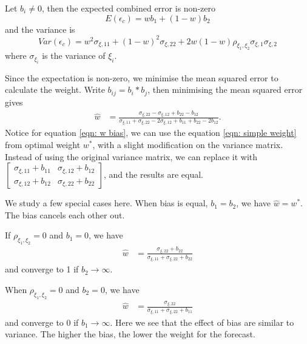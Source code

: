 \documentclass[11pt]{article}
\begin{document}
Let $b_i \neq 0$, then the expected combined error is non-zero
\begin{equation}
E(\epsilon_c) = wb_1+(1-w)b_2
\end{equation}
and the variance is
\begin{equation}
Var(\epsilon_c) = w^2\sigma_{\xi,11} + (1-w)^2\sigma_{\xi,22} + 2w(1-w)\rho_{\xi_1,\xi_2}\sigma_{\xi,1}\sigma_{\xi,2}
\end{equation}
where $\sigma_{\xi_i}$ is the variance of $\xi_i$.

Since the expectation is non-zero, we minimise the mean squared error to calculate the weight.
Write \(b_{ij}=b_i*b_j\), then minimising the mean squared error gives
\begin{equation}
\label{eqn: w bias}
\begin{aligned}
\hat{w} &= \frac{\sigma_{\xi,22}-\sigma_{\xi,12}+b_{22}-b_{12}}{\sigma_{\xi,11}+\sigma_{\xi,22}-2\sigma_{\xi,12}+b_{11}+b_{22}-2b_{12}}.
\end{aligned}
\end{equation}
Notice for equation \ref{eqn: w bias}, we can use the equation \ref{eqn: simple weight} from optimal weight $w^*$, with a slight modification on the variance matrix. Instead of using the original variance matrix, we can replace it with
\(\begin{bmatrix}\sigma_{\xi,11}+b_{11} & \sigma_{\xi,12}+b_{12}\\ \sigma_{\xi,12}+b_{12} & \sigma_{\xi,22}+b_{22}\end{bmatrix}\), and the results are equal.

We study a few special cases here. When bias is equal, $b_1=b_2$, we have $\hat{w}=w^*$. The bias cancels each other out. 

If $\rho_{\xi_1,\xi_2}=0$ and $b_1=0$, we have
\begin{equation}
\begin{aligned}
\hat{w} &= \frac{\sigma_{\xi,22}+b_{22}}{\sigma_{\xi,11}+\sigma_{\xi,22}+b_{22}}
\end{aligned}
\end{equation}
and converge to 1 if $b_2 \to \infty$.

When $\rho_{\xi_1,\xi_2}=0$ and $b_2=0$, we have
\begin{equation}
\begin{aligned}
\hat{w} &= \frac{\sigma_{\xi,22}}{\sigma_{\xi,11}+\sigma_{\xi,22}+b_{11}}
\end{aligned}
\end{equation}
and converge to 0 if $b_1 \to \infty$. Here we see that the effect of bias are similar to variance. The higher the bias, the lower the weight for the forecast.
\end{document}
